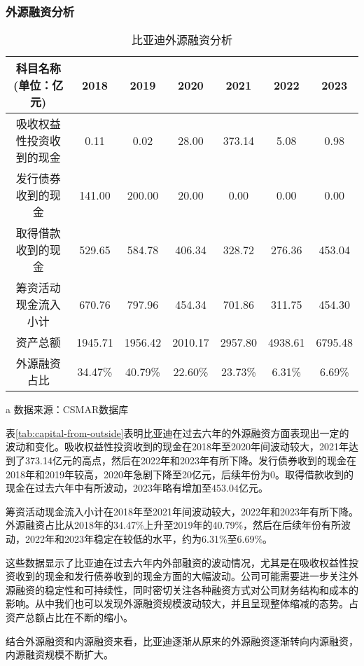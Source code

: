 \subsubsection{外源融资分析}
\begin{table}
  \centering
  \begin{threeparttable}[c]
    \caption{比亚迪外源融资分析}
    \label{tab:capital-from-outside}
    \begin{tabular}{ccccccc}
      \toprule
        科目名称(单位：亿元) & 2018 & 2019 & 2020 & 2021 & 2022 & 2023 \\ 
      \midrule
        吸收权益性投资收到的现金 & 0.11  & 0.02  & 28.00  & 373.14  & 5.08  & 0.98  \\ 
        发行债券收到的现金 & 141.00  & 200.00  & 20.00  & 0.00  & 0.00  & 0.00  \\ 
        取得借款收到的现金 & 529.65  & 584.78  & 406.34  & 328.72  & 276.36  & 453.04  \\ 
        筹资活动现金流入小计 & 670.76  & 797.96  & 454.34  & 701.86  & 311.75  & 454.30  \\ 
        资产总额 & 1945.71  & 1956.42  & 2010.17  & 2957.80  & 4938.61  & 6795.48  \\ 
        外源融资占比 & 34.47\% & 40.79\% & 22.60\% & 23.73\% & 6.31\% & 6.69\% \\ 
      \bottomrule
    \end{tabular}
    \begin{tablenotes}
      \item [a] 数据来源：CSMAR数据库
    \end{tablenotes}
  \end{threeparttable}
\end{table}
表\eqref{tab:capital-from-outside}表明比亚迪在过去六年的外源融资方面表现出一定的波动和变化。吸收权益性投资收到的现金在2018年至2020年间波动较大，2021年达到了373.14亿元的高点，然后在2022年和2023年有所下降。发行债券收到的现金在2018年和2019年较高，2020年急剧下降至20亿元，后续年份为0。取得借款收到的现金在过去六年中有所波动，2023年略有增加至453.04亿元。

筹资活动现金流入小计在2018年至2021年间波动较大，2022年和2023年有所下降。外源融资占比从2018年的34.47\%上升至2019年的40.79\%，然后在后续年份有所波动，2022年和2023年稳定在较低的水平，约为6.31\%至6.69\%。

这些数据显示了比亚迪在过去六年内外部融资的波动情况，尤其是在吸收权益性投资收到的现金和发行债券收到的现金方面的大幅波动。公司可能需要进一步关注外源融资的稳定性和可持续性，同时密切关注各种融资方式对公司财务结构和成本的影响。从中我们也可以发现外源融资规模波动较大，并且呈现整体缩减的态势。占资产总额占比在不断的缩小。

结合外源融资和内源融资来看，比亚迪逐渐从原来的外源融资逐渐转向内源融资，内源融资规模不断扩大。
